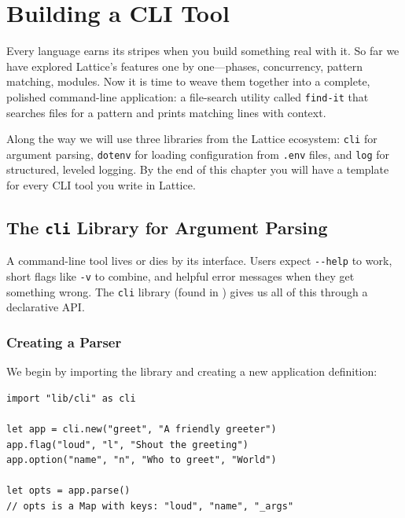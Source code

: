 \chapter{Building a CLI Tool}\label{ch:building-cli-tool}


Every language earns its stripes when you build something real with it.
So far we have explored Lattice's features one by one---phases, concurrency, pattern matching, modules.
Now it is time to weave them together into a complete, polished command-line application: a file-search utility called \texttt{find-it} that searches files for a pattern and prints matching lines with context.

Along the way we will use three libraries from the Lattice ecosystem:
\lstinline|cli| for argument parsing,
\lstinline|dotenv| for loading configuration from \texttt{.env} files,
and \lstinline|log| for structured, leveled logging.
By the end of this chapter you will have a template for every CLI tool you write in Lattice.

\section{The \texttt{cli} Library for Argument Parsing}\label{sec:cli-library}


A command-line tool lives or dies by its interface. Users expect \texttt{-{}-help} to work, short flags like \texttt{-v} to combine, and helpful error messages when they get something wrong.
The \lstinline|cli| library (found in ) gives us all of this through a declarative API.

\subsection{Creating a Parser}\label{sec:cli-creating-parser}

We begin by importing the library and creating a new application definition:

\begin{lstlisting}[language=Lattice, caption={A minimal CLI parser}]
import "lib/cli" as cli

let app = cli.new("greet", "A friendly greeter")
app.flag("loud", "l", "Shout the greeting")
app.option("name", "n", "Who to greet", "World")

let opts = app.parse()
// opts is a Map with keys: "loud", "name", "_args"
\end{lstlisting}

